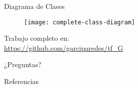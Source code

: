 \documentclass[12pt]{beamer}
\begin{document}
    \begin{frame}[fragile]{Diagrama de Clases}

      \begin{figure}
        \texttt{[image: complete-class-diagram]}
        \caption{}
        \label{}
      \end{figure}

    \end{frame}


    \begin{frame}[standout]
      Trabajo completo en: \\
      \small\url{https://github.com/garciparedes/tf_G}
    \end{frame}

  \begin{frame}[standout]
    ¿Preguntas?
  \end{frame}


  \begin{frame}[allowframebreaks]{Referencias}

    
    

  \end{frame}
\end{document}

